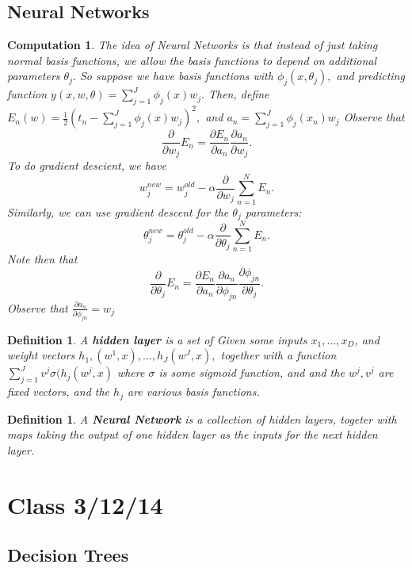 \documentclass{amsart}
\newtheorem{comp}[subsubsection]{Computation}
\newtheorem{defn}[subsubsection]{Definition}
\begin{document}
\subsection{Neural Networks}
\begin{comp}
The idea of Neural Networks is that instead of just taking normal basis functions, we allow the basis functions to depend on additional parameters $\theta_j.$ So suppose we have basis functions with $\phi_j(x,\theta_j),$ and predicting function $y(x,w,\theta) = \sum_{j=1}^J \phi_j(x)w_j.$ Then, define $E_n(w) = \frac 1 2 \left(t_n - \sum_{j=1}^J\phi_j(x)w_j \right)^2,$ and $a_n = \sum_{j=1}^J \phi_j(x_n)w_j$
Observe that
$$\frac {\partial}{\partial w_j} E_n = \frac {\partial E_n}{\partial a_n} \frac {\partial a_n}{\partial w_j}.$$
To do gradient descient, we have
$$w_j^{new} = w_j^{old} - \alpha \frac {\partial}{\partial w_j} \sum_{n=1}^NE_n.$$
Similarly, we can use gradient descent for the $\theta_j$ parameters:
$$\theta_j^{new} = \theta_j^{old} - \alpha \frac {\partial}{\partial \theta_j} \sum_{n=1}^NE_n.$$
Note then that
$$\frac {\partial}{\partial \theta_j} E_n = \frac {\partial E_n}{\partial a_n} \frac {\partial a_n}{\partial \phi_{jn}}\frac {\partial \phi_{jn}}{\partial \theta_j}.$$
Observe that $\frac {\partial{a_n}}{\partial \phi_{jn}} = w_j$
\end{comp}

\begin{defn}
A {\bf hidden layer} is a set of
Given some inputs $x_1, \ldots, x_D$, and weight vectors $h_1,(w^1,x), \ldots, h_J(w^J,x),$ together with a function $\sum_{j=1}^J v^j \sigma(h_j(w^j,x)$ where $\sigma$ is some sigmoid function, and and the $w^j,v^j$ are fixed vectors, and the $h_j$ are various basis functions.
\end{defn}

\begin{defn}
A {\bf Neural Network} is a collection of hidden layers, togeter with maps taking the output of one hidden layer as the inputs for the next hidden layer.
\end{defn}

\section{Class 3/12/14}

\subsection{Decision Trees}
\end{document}
